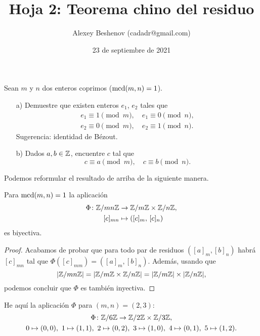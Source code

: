 \documentclass{article}
\title{Hoja 2: Teorema chino del residuo}
\author{Alexey Beshenov (cadadr@gmail.com)}
\date{23 de septiembre de 2021}
\begin{document}
\maketitle
\thispagestyle{empty}

\setcounter{section}{2}

\begin{problema}
  \label{probl:CRT}
  Sean $m$ y $n$ dos enteros coprimos ($\operatorname{mcd} (m,n) = 1$).

  \begin{itemize}
  \item[a)] Demuestre que existen enteros $e_1$, $e_2$ tales que
    \begin{gather*}
      e_1 \equiv 1 \pmod{m}, \quad e_1 \equiv 0 \pmod{n}, \\
      e_2 \equiv 0 \pmod{m}, \quad e_2 \equiv 1 \pmod{n}.
    \end{gather*}
    Sugerencia: identidad de Bézout.

  \item[b)] Dados $a, b \in \mathbb{Z}$, encuentre $c$ tal que
    $$c \equiv a \pmod{m}, \quad c \equiv b \pmod{n}.$$
  \end{itemize}
\end{problema}

Podemos reformular el resultado de arriba de la siguiente manera.

\begin{framed}
  Para $\operatorname{mcd} (m,n) = 1$ la aplicación
  \begin{align*}
    \Phi\colon \mathbb{Z}/mn\mathbb{Z} & \to \mathbb{Z}/m\mathbb{Z} \times \mathbb{Z}/n\mathbb{Z},\\
    [c]_{mn} & \mapsto ([c]_m, \, [c]_n)
  \end{align*}
  es biyectiva.
\end{framed}

\begin{proof}
  Acabamos de probar que para todo par de residuos $([a]_m, [b]_n)$ habrá
  $[c]_{mn}$ tal que $\Phi ([c]_{mm}) = ([a]_m,[b]_n)$.  Además, usando que
  $$|\mathbb{Z}/mn\mathbb{Z}| = |\mathbb{Z}/m\mathbb{Z} \times \mathbb{Z}/n\mathbb{Z}| = |\mathbb{Z}/m\mathbb{Z}| \times |\mathbb{Z}/n\mathbb{Z}|,$$
  podemos concluir que $\Phi$ es también inyectiva.
\end{proof}

\begin{ejemplo}
  He aquí la aplicación $\Phi$ para $(m,n) = (2,3)$:
  \begin{gather*}
    \Phi\colon \mathbb{Z}/6\mathbb{Z} \to \mathbb{Z}/2\mathbb{Z} \times \mathbb{Z}/3\mathbb{Z},\\
    0 \mapsto (0,0), ~
    1 \mapsto (1,1), ~
    2 \mapsto (0,2), ~
    3 \mapsto (1,0), ~
    4 \mapsto (0,1), ~
    5 \mapsto (1,2).
  \end{gather*}
\end{ejemplo}
\end{document}
